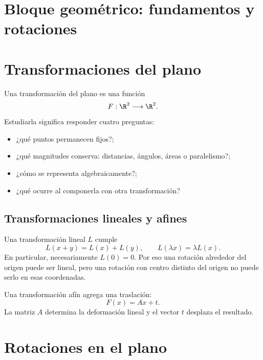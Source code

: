 \section{Bloque geométrico: fundamentos y rotaciones}\label{cap:07}

\section{Transformaciones del plano}\label{sec:transf-plano}

Una transformación del plano es una función
\[
  F:\R^2\longrightarrow\R^2.
\]
Estudiarla significa responder cuatro preguntas:
\begin{itemize}
  \item ¿qué puntos permanecen fijos?;
  \item ¿qué magnitudes conserva: distancias, ángulos, áreas o paralelismo?;
  \item ¿cómo se representa algebraicamente?;
  \item ¿qué ocurre al componerla con otra transformación?
\end{itemize}

\subsection{Transformaciones lineales y afines}

Una transformación lineal \(L\) cumple
\[
  L(x+y)=L(x)+L(y),\qquad L(\lambda x)=\lambda L(x).
\]
En particular, necesariamente \(L(0)=0\). Por eso una rotación alrededor del origen puede ser
lineal, pero una rotación con centro distinto del origen no puede serlo en esas coordenadas.

Una transformación afín agrega una traslación:
\[
  F(x)=Ax+t.
\]
La matriz \(A\) determina la deformación lineal y el vector \(t\) desplaza el resultado.

\section{Rotaciones en el plano}\label{sec:rot-plano}

{\small\vspace{1mm}\par}
{\small\vspace{1mm}\par}


